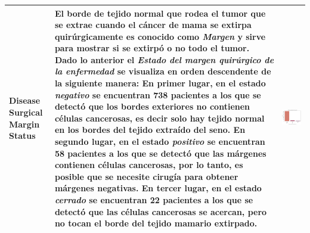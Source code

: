 \begin{table}[!htb]
	\footnotesize
	\begin{threeparttable}
		\begin{tabular}{p{2.5cm} p{7.5cm} p{6.5cm}} \toprule
			
			Disease Surgical Margin Status
			& El borde de tejido normal que rodea el tumor que se extrae cuando el cáncer de mama se extirpa quirúrgicamente es conocido como \textit{Margen} y sirve para mostrar si se extirpó o no todo el tumor\cite{Susan}. Dado lo anterior el \textit{Estado del margen quirúrgico de la enfermedad} se visualiza en orden descendente de la siguiente manera: En primer lugar, en el estado \textit{negativo} se encuentran 738 pacientes a los que se detectó que los bordes exteriores no contienen células cancerosas, es decir solo hay tejido normal en los bordes del tejido extraído del seno. En segundo lugar, en el estado \textit{positivo} se encuentran 58 pacientes a los que se detectó que las márgenes contienen células cancerosas, por lo tanto, es posible que se necesite cirugía para obtener márgenes negativas. En tercer lugar, en el estado \textit{cerrado} se encuentran 22 pacientes a los que se detectó que las células cancerosas se acercan, pero no tocan el borde del tejido mamario extirpado.
			& \begin{center}\includegraphics[width=1\linewidth]{NOTEBOOK/IMAGENES_DESCRIPTIVAS/34_disease_surgical_margin_status}\end{center}
			\\ \hline
			

\end{tabular}
\end{threeparttable}
\end{table}
